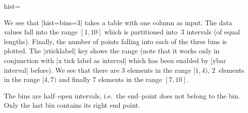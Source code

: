 {\begin{plottype}[/pgfplots]{hist=\textcolor{black}{\normalfont{}}}
\begin{codeexample}[]
\begin{tikzpicture}
\begin{axis}[
  ybar interval,
  xticklabel=
\pgfmathprintnumber\tick--\pgfmathprintnumber\nexttick
]
{	};
\end{axis}
\end{tikzpicture}
\end{codeexample}
	We see that |hist={bins=3}| takes a table with one column as input. The data values fall into the range $[1,10]$ which is partitioned into~$3$ intervals (of equal lengths). Finally, the number of points falling into each of the three bins is plotted. The |xticklabel| key shows the range (note that it works only in conjunction with |x tick label as interval| which has been enabled by |ybar interval| before). We see that there are $3$ elements in the range $[1,4)$, $2$~elements in the range $[4,7)$ and finally $7$ elements in the range $[7,10]$. 
	
	The bins are half--open intervals, i.e.\ the end--point does not belong to the bin. Only the last bin contains its right end point.
\pgfplotsexpensiveexample
\begin{codeexample}[]
\begin{tikzpicture}
\begin{axis}[
  ybar interval,
  xtick=,%
  xticklabel=
    {$[\pgfmathprintnumber\tick,%
	   \pgfmathprintnumber\nexttick)$}
]
\addplot+[hist={data=x}]
	file {plotdata/pgfplots.randn.dat};
	
\end{axis}
\end{tikzpicture}
\end{codeexample}


\end{plottype}}
